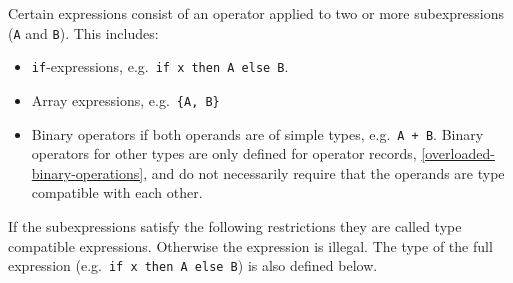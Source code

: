 Certain expressions consist of an operator applied to two or more subexpressions (\lstinline!A! and \lstinline!B!).
This includes:
\begin{itemize}
\item \lstinline!if!-expressions, e.g.\ \lstinline!if x then A else B!.
\item Array expressions, e.g.\ \lstinline!{A, B}!
\item Binary operators if both operands are of simple types, e.g.\ \lstinline!A + B!.
Binary operators for other types are only defined for operator records, \cref{overloaded-binary-operations}, and do not necessarily require that the operands are type compatible with each other.
\end{itemize}
If the subexpressions satisfy the following restrictions they are called type compatible expressions.
Otherwise the expression is illegal.
The type of the full expression (e.g.\ \lstinline!if x then A else B!) is also defined below.

